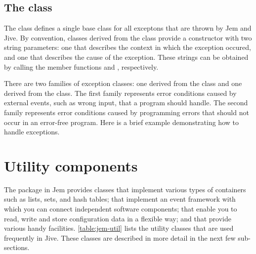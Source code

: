 

\subsection*{The  class}

The  class defines a single base class for all exceptons
that are thrown by Jem and Jive. By convention, classes derived from the
 class provide a constructor with two string parameters:
one that describes the context in which the exception occured, and one
that describes the cause of the exception. These strings can be obtained
by calling the member functions  and ,
respectively.

There are two families of exception classes: one derived from the
 class and one derived from the 
class. The first family represents error conditions caused by external
events, such as wrong input, that a program should handle. The second
family represents error conditions caused by programming errors that
should not occur in an error-free program. Here is a brief example
demonstrating how to handle exceptions.



\section{Utility components}

The package  in Jem provides classes that implement various
types of containers such as lists, sets, and hash tables; that implement
an event framework with which you can connect independent software
components; that enable you to read, write and store configuration data
in a flexible way; and that provide various handy facilities.
\autoref{table:jem-util} lists the utility classes that are used
frequently in Jive. These classes are described in more detail in the
next few sub-sections.

